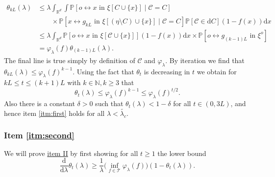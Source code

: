 \documentclass[a4paper,12pt]{scrartcl}
\renewcommand{\P}{\mathbb{P}}
\renewcommand{\d}{\mathrm{d}}
\theoremstyle{definition}
\theoremstyle{remark}
\begin{document}
\begin{equation}
  \begin{aligned}
    \theta_{kL}(\lambda)
    & \le
    \lambda
    \int_{\mathbb R^d} \int
    \P[
      o\leftrightarrow x \text{ in } \xi[C\cup \{x\}]
      \mid
      \mathcal C = C
    ]                                                 \\ &\qquad \times
    \P[
      x\leftrightarrow g_{k L} %
      \text{ in } \xi[(\eta\setminus C)\cup \{x\}]
      \mid
      \mathcal C = C
    ]
    \P[\mathcal C\in \d C]
    (1-f(x))
    \d x                                              \\
    & \leq
    \lambda\int_{\mathbb R^d}
    \P[
      o\leftrightarrow x \text{ in } \xi[\mathcal C\cup \{x\}]
    ]
    (1-f(x))
    \d x \times
    \P[
      o\leftrightarrow
      g_{(k-1)L}
      \text{ in } \xi^{o}
    ]
    \\
    & = \varphi_\lambda(f) \theta_{(k-1)L}(\lambda).
  \end{aligned}
\end{equation}
The final line is true simply by definition of $\mathcal C$ and $\varphi_\lambda$.
By iteration we find that $
\theta_{kL}(\lambda)\leq \varphi_\lambda(f)^{k-1}.
$
Using  the fact that $\theta_t$ is decreasing in $t$ we obtain
for $kL \leq t \leq (k+1)L$
with $k \in \mathbb N,  k \geq 3$
that
$$
\theta_t(\lambda) \leq \varphi_\lambda(f)^{k-1} \leq \varphi_\lambda(f)^{t/2}.
$$
Also there is a constant $\delta >0$ such that $\theta_t(\lambda) < 1- \delta$
for all $ t \in (0, 3L)$, and hence
item \ref{itm:first} holds for all $\lambda<\widetilde{\lambda_c}$.

\subsubsection{Item \ref{itm:second}}
We will prove \hyperref[thm:sharpness]{item II} by first showing for all $t\geq1$ the lower bound
\begin{equation}\label{eq:diff_ineq}
  \frac{\d}{\d\lambda}\theta_t(\lambda)
  \geq
  \frac{1}{\lambda}\big(\inf_{f\in\mathcal T}\varphi_\lambda(f)\big) (1-\theta_t(\lambda)).
\end{equation}
\end{document}
